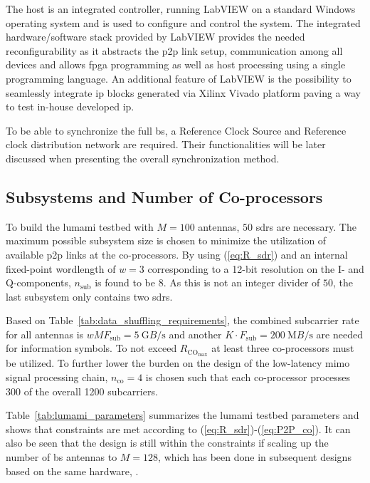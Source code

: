 \documentclass[journal]{IEEEtran}
\begin{document}
The host \cite{host} is an integrated controller, running LabVIEW on a standard Windows operating system and is used to configure and control the system.
The integrated hardware/software stack provided by LabVIEW provides the needed reconfigurability as it abstracts the \gls{p2p} link setup, communication among all devices and allows \gls{fpga} programming as well as host processing using a single programming language. 
An additional feature of LabVIEW is the possibility to seamlessly integrate \gls{ip} blocks generated via Xilinx Vivado platform paving a way to test in-house developed \gls{ip}.  

To be able to synchronize the full \gls{bs}, a Reference Clock Source \cite{timing_mod} and Reference clock distribution network \cite{clock_distribution} are required. 
Their functionalities will be later discussed when presenting the overall synchronization method.

\subsection{Subsystems and Number of Co-processors}
To build the \gls{lumami} testbed with $M=100$ antennas, $50$ \glspl{sdr} are necessary.
The maximum possible subsystem size is chosen to minimize the utilization of available \gls{p2p} links at the co-processors.
%
By using (\ref{eq:R_sdr}) and an internal fixed-point wordlength of $w=3$ corresponding to a 12-bit resolution on the I- and Q-components, $n_\text{sub}$ is found to be $8$.
As this is not an integer divider of $50$, the last subsystem only contains two \glspl{sdr}.

Based on Table~\ref{tab:data_shuffling_requirements}, the combined subcarrier rate for all antennas is $wMF_\text{sub}=\SI{5}{\giga B\per\second}$ and another $K\cdot F_\text{sub}=\SI{200}{\mega B\per\second}$ are needed for information symbols.
To not exceed $R_{\text{CO}_\text{max}}$ at least three co-processors must be utilized.
To further lower the burden on the design of the low-latency \gls{mimo} signal processing chain, $n_\text{co}=4$ is chosen such that each co-processor processes $300$ of the overall 1200 subcarriers.

Table~\ref{tab:lumami_parameters} summarizes the \gls{lumami} testbed parameters and shows that constraints are met according to (\ref{eq:R_sdr})-(\ref{eq:P2P_co}).
It can also be seen that the design is still within the constraints if scaling up the number of \gls{bs} antennas to $M=128$, which has been done in subsequent designs based on the same hardware, \eg \cite{Bristol1}.
\end{document}
